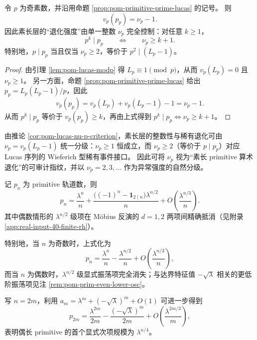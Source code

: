 \begin{corollary}\label{cor:pom-lucas-nu-p-criterion}
令 \(p\) 为奇素数，并沿用命题 \ref{prop:pom-primitive-prime-lucas} 的记号。
则
\[
v_p(p_p)=\nu_p-1.
\]
因此素长层的“退化强度”由单一整数 \(\nu_p\) 完全控制：对任意 \(k\ge 1\)，
\[
p^{k}\mid p_p
\qquad\Longleftrightarrow\qquad
\nu_p\ge k+1.
\]
特别地，\(p\mid p_p\) 当且仅当 \(\nu_p\ge 2\)，等价于 \(p^2\mid(L_p-1)\)。
\end{corollary}
\begin{proof}
由引理 \ref{lem:pom-lucas-modp} 得 \(L_p\equiv 1\pmod p\)，从而 \(v_p(L_p)=0\) 且 \(\nu_p\ge 1\)。
另一方面，命题 \ref{prop:pom-primitive-prime-lucas} 给出
\(
p_p=L_p(L_p-1)/p
\)，因此
\[
v_p(p_p)=v_p(L_p)+v_p(L_p-1)-1=\nu_p-1.
\]
从而 \(p^k\mid p_p\) 等价于 \(v_p(p_p)\ge k\)，再由上式得到 \(p^k\mid p_p\Longleftrightarrow \nu_p\ge k+1\)。
\end{proof}

\begin{remark}\label{rem:pom-lucas-wieferich}
由推论 \ref{cor:pom-lucas-nu-p-criterion}，素长层的整数性与稀有退化可由
\(
\nu_p=v_p(L_p-1)
\)
统一分级：\(\nu_p\ge 1\) 恒成立，而 \(\nu_p\ge 2\)（等价于 \(p\mid p_p\)）对应 Lucas 序列的 Wieferich 型稀有事件接口。
因此可将 \(\nu_p\) 视为“素长 primitive 算术退化”的可审计指纹，并以 \(\nu_p=2,3,\dots\) 作为异常强度的自然分级。
\end{remark}

\begin{corollary}\label{cor:pom-prim-odd-even}
记 $p_n$ 为 primitive 轨道数，则
\[
p_n=\frac{\lambda^n}{n}+\frac{\bigl((-1)^n-\mathbf{1}_{2\mid n}\bigr)\lambda^{n/2}}{n}
+O\!\left(\frac{\lambda^{n/3}}{n}\right).
\]
其中偶数情形的 $\lambda^{n/2}$ 级项在 Möbius 反演的 $d=1,2$ 两项间精确抵消（见附录 \ref{app:real-input-40-finite-rh}）。
\par
特别地，当 \(n\) 为奇数时，上式化为
\[
p_n=\frac{\lambda^n}{n}-\frac{\lambda^{n/2}}{n}+O\!\left(\frac{\lambda^{n/3}}{n}\right),
\]
而当 \(n\) 为偶数时，\(\lambda^{n/2}\) 级显式振荡项完全消失；与达界特征值 \(-\sqrt{\lambda}\) 相关的更低阶振荡项见注 \ref{rem:pom-prim-even-lower-osc}。
\end{corollary}

\begin{remark}[偶长轨道的更低阶振荡]\label{rem:pom-prim-even-lower-osc}
写 $n=2m$，利用 $a_{m}=\lambda^{m}+(-\sqrt{\lambda})^{m}+O(1)$ 可进一步得到
\[
p_{2m}=\frac{\lambda^{2m}}{2m}-\frac{(-\sqrt{\lambda})^{m}}{2m}
+O\!\left(\frac{\lambda^{2m/3}}{m}\right),
\]
表明偶长 primitive 的首个显式次项规模为 $\lambda^{n/4}$。
\end{remark}

